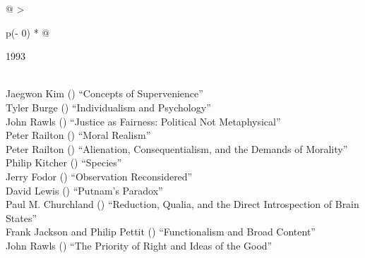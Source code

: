 \documentclass[
  10pt,
  letterpaper,
  DIV=11,
  numbers=noendperiod,
  twoside]{scrartcl}
\begin{document}
\begin{longtable}[]{@{}
  >{\raggedright\arraybackslash}p{(\columnwidth - 0\tabcolsep) * }@{}}

\caption{\label{tbl-top-ten-1984}Most cited articles published less than
ten years ago as of 1993.}

\tabularnewline

\toprule\noalign{}
\begin{minipage}[b]{\linewidth}\raggedright
1993
\end{minipage} \\
\midrule\noalign{}
\endhead
\bottomrule\noalign{}
\endlastfoot
Jaegwon Kim
()
``Concepts of Supervenience'' \\
Tyler Burge
()
``Individualism and Psychology'' \\
John Rawls
()
``Justice as Fairness: Political Not Metaphysical'' \\
Peter Railton
()
``Moral Realism'' \\
Peter Railton
()
``Alienation, Consequentialism, and the Demands of Morality'' \\
Philip Kitcher
()
``Species'' \\
Jerry Fodor
()
``Observation Reconsidered'' \\
David Lewis
()
``Putnam's Paradox'' \\
Paul M. Churchland
()
``Reduction, Qualia, and the Direct Introspection of Brain States'' \\
Frank Jackson and Philip Pettit
()
``Functionalism and Broad Content'' \\
John Rawls
()
``The Priority of Right and Ideas of the Good'' \\

\end{longtable}
\end{document}
